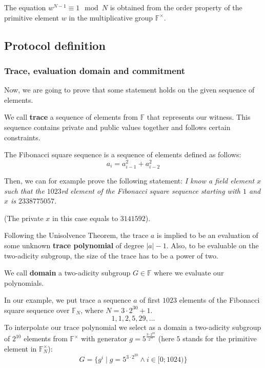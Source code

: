 \documentclass[../lecture-notes.tex]{subfiles}
\begin{document}
\begin{remark}
The equation $w^{N - 1} \equiv 1 \mod N$ is obtained from the order property of the primitive element $w$ in the multiplicative group $\mathbb{F}^{\times}$. 
\end{remark}

\subsection{Protocol definition}

\subsubsection{Trace, evaluation domain and commitment}
Now, we are going to prove that some statement holds on the given sequence of elements.

\begin{definition}
We call \textbf{trace} a sequence of elements from $\mathbb{F}$ that represents our witness. This sequence contains private and public values together and follows certain constraints.
\end{definition}

\begin{example}
The Fibonacci square sequence is a sequence of elements defined as follows: 
\begin{equation*}
a_{i} = a_{i-1}^2 + a_{i-2}^2  
\end{equation*}

Then, we can for example prove the following statement:
\textit{I know a field element $x$ such that the $1023$rd element of the Fibonacci square sequence starting with $1$ and $x$ is $2338775057$.} 

(The private $x$ in this case equals to $3141592$).
\end{example}

Following the Unisolvence Theorem, the trace $a$ is implied to be an evaluation of some unknown \textbf{trace polynomial} of degree $|a| - 1$. Also, to be evaluable on the two-adicity subgroup, the size of the trace has to be a power of two.

\begin{definition}
We call \textbf{domain} a two-adicity subgroup $G \in \mathbb{F}$ where we evaluate our polynomials.
\end{definition}

\begin{example}
In our example, we put trace a sequence $a$ of first $1023$ elements of the Fibonacci square sequence over $\mathbb{F}_N$, where $N=3\cdot 2^{30} + 1$.
\begin{equation*}
1, 1, 2, 5, 29, ...
\end{equation*}
To interpolate our trace polynomial we select as a domain a two-adicity subgroup of $2^{10}$ elements from $\mathbb{F}^\times$ with generator $g = 5^{\frac{3\cdot 2^{30}}{2^{10}}}$ (here $5$ stands for the primitive element in $\mathbb{F}^\times_N$):
\begin{equation*}
G = \{g^i \;|\; g = 5^{3\cdot 2^{20}} \land i \in [0;1024) \}
\end{equation*}
\end{example}
\end{document}
